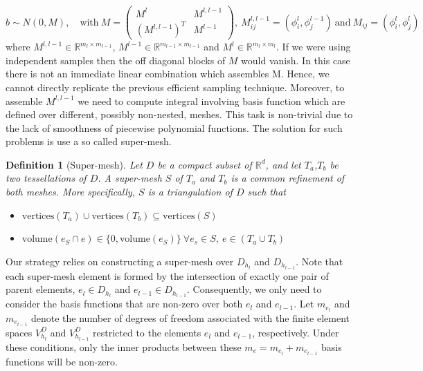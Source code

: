 \documentclass[a4paper, 11pt, oneside]{scrartcl}
\newtheorem{definition}{Definition}
\begin{document}
\begin{equation}
b \sim N(0,M), \quad \text{with} \ M = \begin{pmatrix}
M^l & M^{l,l-1} \\
(M^{l,l-1})^T & M^{l-1}
\end{pmatrix},
\ M_{ij}^{l,l-1} = ( \phi_i^{l}, \phi_j^{l-1} ) \ \text{and} \ M_{ij}=(\phi_i^l,\phi_j^l)
\end{equation}
where \( M^{l,l-1} \in \mathbb{R}^{m_l \times m_{l-1}} \), \(M^{l-1} \in \mathbb{R}^{m_{l-1} \times m_{l-1}} \) and \( M^l \in \mathbb{R}^{m_l \times m_l} \).
If we were using independent samples then the off diagonal blocks of \(M\) would vanish. 
In this case there is not an immediate linear combination which assembles M. Hence, we cannot directly replicate the previous efficient sampling technique.
Moreover, to assemble \( M^{l,l-1}\) we need to compute integral involving basis function which are defined over different, possibly non-nested, meshes. This task is non-trivial due to the lack of smoothness of piecewise polynomial functions.
The solution for such problems is use a so called super-mesh.
\begin{definition}[Super-mesh] Let \(D\) be a compact subset of \(\mathbb{R}^d\), and let \( T_a\),\(T_b\) be two tessellations of \(D\). A super-mesh \( S\) of \( T_a\) and \(T_b\) is a common refinement of both meshes.
More specifically, \( S\) is a triangulation of \(D\) such that
\begin{itemize}
\item[1] \(\text{vertices}(T_a) \cup \text{vertices}(T_b) \subseteq \text{vertices}(S)\)
\item[2] \(\text{volume}(e_S \cap e) \in \{ 0,\text{volume}(e_S) \} \ \forall e_s \in S, \ e \in (T_a \cup T_b) \)
\end{itemize}
\end{definition}
Our strategy relies on constructing a super-mesh over \(D_{h_l}\) and \( D_{h_{l-1}}\). Note that each super-mesh element is formed by the intersection of exactly one pair of parent elements, \(e_l \in D_{h_l}\) and \( e_{l-1} \in D_{h_{l-1}}\). Consequently, we only need to consider the basis functions that are non-zero over both \(e_l\) and \( e_{l-1}\). Let \(m_{e_l} \) and \(m_{e_{l-1}}\) denote the number of degrees of freedom associated with the finite element spaces \(V_{h_l}^D\) and \( V_{h_{l-1}}^D \) restricted to the elements \( e_l\) and \( e_{l-1} \), respectively. Under these conditions, only the inner products between these \(m_e = m_{e_l} + m_{e_{l-1}}\) basis functions will be non-zero. \\
\end{document}
